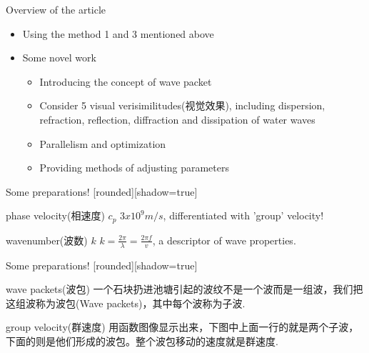 \documentclass{beamer}
\begin{document}
\begin{frame}{Overview of the article}
  \begin{itemize}
    \item Using the method 1 and 3 mentioned above
    \item Some novel work
      \begin{itemize}
        \item Introducing the concept of \textcolor[rgb]{0,0,1}{wave packet}
        \item Consider 5 visual verisimilitudes(视觉效果), including dispersion, refraction, reflection, diffraction and dissipation of water waves
        \item Parallelism and optimization
        \item Providing methods of adjusting parameters
      \end{itemize}
  \end{itemize}
\end{frame}
\begin{frame}{Some preparations!}
  [rounded][shadow=true]
  \begin{block}{phase velocity(相速度) $c_p$}
    $3x10^9 m/s$, differentiated with 'group' velocity!
  \end{block}
  \begin{block}{wavenumber(波数) $k$}
    $k=\frac{2\pi}{\lambda}=\frac{2\pi f}{v}$, a descriptor of wave properties.
  \end{block}
\end{frame}
\begin{frame}{Some preparations!}
  [rounded][shadow=true]
  \begin{block}{wave packets(波包)}
    一个石块扔进池塘引起的波纹不是一个波而是一组波，我们把这组波称为波包(Wave packets)，其中每个波称为子波.
  \end{block}
  \begin{block}{group velocity(群速度)}
    用函数图像显示出来，下图中上面一行的就是两个子波，下面的则是他们形成的波包。整个波包移动的速度就是群速度.
  \end{block}

\end{frame}
\end{document}

